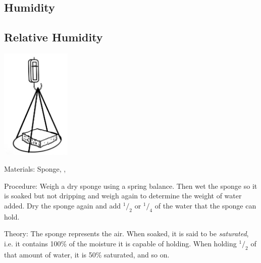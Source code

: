\begin{multicols}{2}

\section*{Humidity}


\subsection{Relative Humidity}

\begin{center}
\includegraphics[width=0.25\textwidth]{./img/rel-humidity.jpg}
\end{center}

\begin{description*}
\item[Materials:]{Sponge, , }
\item[Procedure:]{Weigh a dry sponge using a spring balance. Then wet the sponge so it is soaked but not dripping and weigh again to determine the weight of water added. Dry the sponge again and add $^1/_2$ or $^1/_4$ of the water that the sponge can hold. }
\item[Theory:]{The sponge represents the air. When soaked, it is said to be \emph{saturated}, i.e. it contains 100\% of the moisture it is capable of holding. When holding $^1/_2$ of that amount of water, it is 50\% saturated, and so on.}
\end{description*}


\end{multicols}
